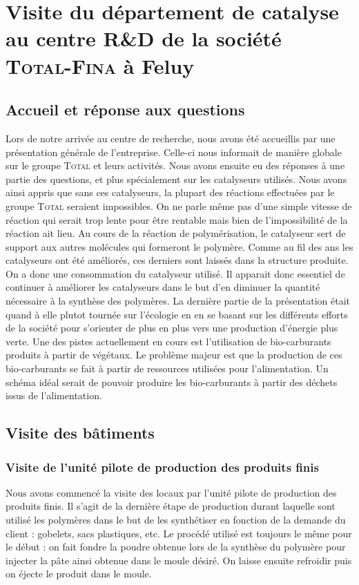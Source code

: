 \section{Visite du département de catalyse au centre R\&D de la société \textsc{Total-Fina} à Feluy}

\subsection{Accueil et réponse aux questions}
Lors de notre arrivée au centre de recherche, nous avons été accueillis par une présentation générale de l'entreprise. Celle-ci nous informait de manière globale sur le groupe \textsc{Total} et leurs activités.
Nous avons ensuite eu des réponses à une partie des questions, et plus spécialement sur les catalyseurs utilisés. Nous avons ainsi appris que sans ces catalyseurs, la plupart des réactions effectuées par le groupe \textsc{Total} seraient impossibles. On ne parle même pas d'une simple vitesse de réaction qui serait trop lente pour être rentable mais bien de l'impossibilité de la réaction ait lieu. Au cours de la réaction de polymérisation, le catalyseur sert de support aux autres molécules qui formeront le polymère. Comme au fil des ans les catalyseurs ont été améliorés, ces derniers sont laissés dans la structure produite. On a donc une consommation du catalyseur utilisé. Il apparait donc essentiel de continuer à améliorer les catalyseurs dans le but d'en diminuer la quantité nécessaire à la synthèse des polymères.
La dernière partie de la présentation était quand à elle plutot tournée sur l'écologie en en se basant sur les différents efforts de la société pour s'orienter de plus en plus vers une production d'énergie plus verte. Une des pistes actuellement en cours est l'utilisation de bio-carburants produits à partir de végétaux. Le problème majeur est que la production de ces bio-carburants se fait à partir de ressources utilisées pour l'alimentation. Un schéma idéal serait de pouvoir produire les bio-carburants à partir des déchets issus de l'alimentation.

\subsection{Visite des bâtiments}

\subsubsection{Visite de l'unité pilote de production des produits finis}
Nous avons commencé la visite des locaux par l'unité pilote de production des produits finis. Il s'agit de la dernière étape de production durant laquelle sont utilisé les polymères dans le but de les synthétiser en fonction de la  demande du client : gobelets, sacs plastiques, etc. Le procédé utilisé est toujours le même pour le début : on fait fondre la poudre obtenue lors de la synthèse du polymère pour injecter la pâte ainsi obtenue dans le moule désiré. On laisse ensuite refroidir puis on éjecte le produit dans le moule.

